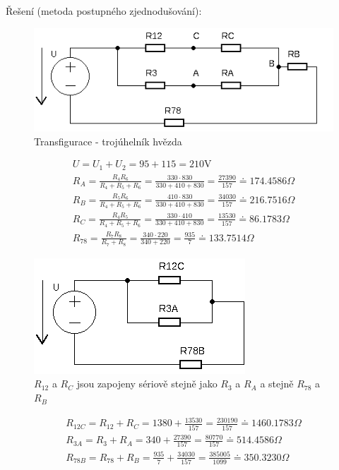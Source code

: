 \documentclass[12pt,a4paper]{article}
\begin{document}
	{\Large Řešení (metoda postupného zjednodušování):}\\
	\begin{figure}[H]
		\center\includegraphics[width=1.1\linewidth]{img1.png}
		\caption*{Transfigurace - trojúhelník \textrightarrow \hspace{0.1cm} hvězda}
\end{figure}
\begin{gather*}
		U = U_1 + U_2 = 95 + 115 = 210 \text{V}\\[0.2cm]
		R_A = \frac{R_4  R_6}{R_4 + R_5 + R_6} = \frac{330 \cdot 830}{330 + 410 + 830} = \frac{27390}{157} \doteq 174.4586 \Omega \\
		R_B = \frac{R_5  R_6}{R_4 + R_5 + R_6} = \frac{410 \cdot 830}{330 + 410 + 830} =
\frac{34030}{157} \doteq 216.7516 \Omega \\ 
		R_C = \frac{R_4  R_5}{R_4 + R_5 + R_6} = \frac{330 \cdot 410}{330 + 410 + 830} = \frac{13530}{157} \doteq 86.1783 \Omega\\
		R_{78} = \frac{R_7 R_8}{R_7+R_8} = \frac{340 \cdot 220}{340 + 220} = \frac{935}{7}  \doteq 133.7514 \Omega
\end{gather*}
\begin{figure}[H]
		\center\includegraphics[width=0.6\linewidth]{img2.png}
		\caption*{$R_{12}$ a $R_C$ jsou zapojeny sériově stejně jako $R_3$ a $R_A$ a  stejně $R_{78}$ a $R_B$}
\end{figure}
\begin{gather*}
	R_{12C} = R_{12} + R_C = 1380 + \frac{13530}{157} = \frac{230190}{157} \doteq 1460.1783 \Omega \\
	R_{3A} = R_3 + R_A = 340 + \frac{27390}{157} = \frac{80770}{157} \doteq 514.4586 \Omega \\
	R_{78B} = R_{78} + R_B = \frac{935}{7} + \frac{34030}{157} = \frac{385005}{1099} \doteq 350.3230 \Omega \\
\end{gather*}
\end{document}
